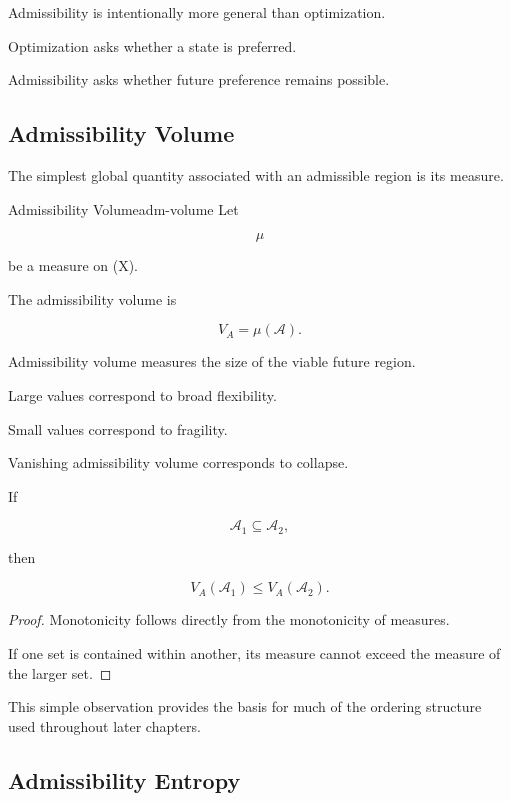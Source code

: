 \documentclass[12pt,twoside,openright]{book}
\newenvironment{prop}
{\begin{proposition}{}{}}
{\end{proposition}}
\newenvironment{rem}
{\begin{remark}{}{}}
{\end{remark}}
\begin{document}
\begin{rem}
Admissibility is intentionally more general than
optimization.

Optimization asks whether a state is preferred.

Admissibility asks whether future preference remains
possible.
\end{rem}

\subsection{Admissibility Volume}

The simplest global quantity associated with an
admissible region is its measure.

\begin{definition}{Admissibility Volume}{adm-volume}
Let

\[
\mu
\]

be a measure on (X).

The admissibility volume is

\[
V_A
=

\mu(\mathcal A).
\]
\end{definition}

Admissibility volume measures the size of the viable
future region.

Large values correspond to broad flexibility.

Small values correspond to fragility.

Vanishing admissibility volume corresponds to collapse.

\begin{prop}
If

\[
\mathcal A_1
\subseteq
\mathcal A_2,
\]

then

\[
V_A(\mathcal A_1)
\le
V_A(\mathcal A_2).
\]
\end{prop}

\begin{proof}
Monotonicity follows directly from the monotonicity of
measures.

If one set is contained within another, its measure
cannot exceed the measure of the larger set.
\end{proof}

This simple observation provides the basis for much of
the ordering structure used throughout later chapters.

\subsection{Admissibility Entropy}
\end{document}
